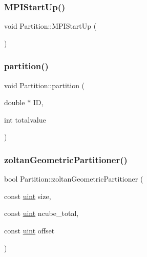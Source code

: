 \mbox{\label{classPartition_ae6fcae8693a77d196cec7eeb91a14b92}} 
\subsubsection{\texorpdfstring{M\+P\+I\+Start\+Up()}{MPIStartUp()}}
{\footnotesize\ttfamily void Partition\+::\+M\+P\+I\+Start\+Up (\begin{DoxyParamCaption}{ }\end{DoxyParamCaption})}

\mbox{\label{classPartition_a7cfafd27a1ace83611ad244cf6fc0bcf}} 
\subsubsection{\texorpdfstring{partition()}{partition()}}
{\footnotesize\ttfamily void Partition\+::partition (\begin{DoxyParamCaption}\item[{double $\ast$}]{ID,  }\item[{int}]{totalvalue }\end{DoxyParamCaption})}

\mbox{\label{classPartition_aa3a2a24791661618215c0ef6be361ac1}} 
\subsubsection{\texorpdfstring{zoltan\+Geometric\+Partitioner()}{zoltanGeometricPartitioner()}}
{\footnotesize\ttfamily bool Partition\+::zoltan\+Geometric\+Partitioner (\begin{DoxyParamCaption}\item[{const \mbox{\hyperlink{definitions_8h_a69aa29b598b851b0640aa225a9e5d61d}{uint}}}]{size,  }\item[{const \mbox{\hyperlink{definitions_8h_a69aa29b598b851b0640aa225a9e5d61d}{uint}}}]{ncube\+\_\+total,  }\item[{const \mbox{\hyperlink{definitions_8h_a69aa29b598b851b0640aa225a9e5d61d}{uint}}}]{offset }\end{DoxyParamCaption})}

